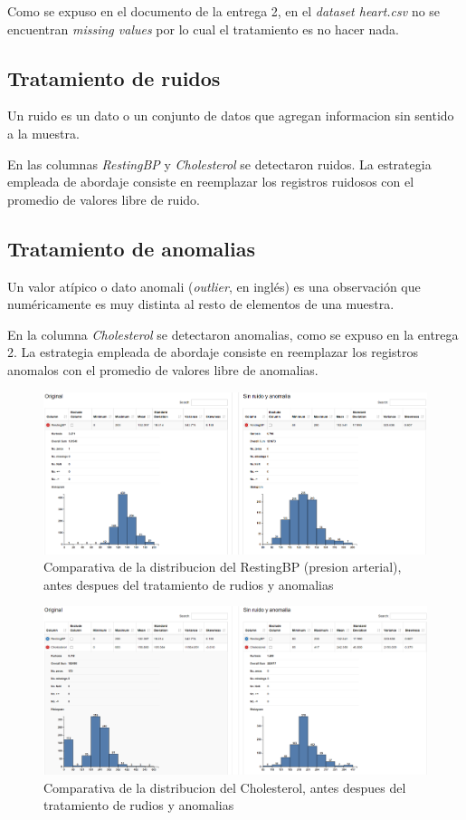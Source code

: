 \documentclass[12pt, letterpaper]{article}
\begin{document}
Como se expuso en el documento de la entrega 2, en el \textit{dataset heart.csv}
no se encuentran \textit{missing values} por lo cual el tratamiento es no hacer nada.

\subsection{Tratamiento de ruidos}
Un ruido es un dato o un conjunto de datos que agregan informacion sin sentido a la muestra.
\cite{ruido}

En las columnas \textit{RestingBP} y \textit{Cholesterol} se detectaron ruidos. 
La estrategia empleada de abordaje consiste en reemplazar los registros ruidosos
con el promedio de valores libre de ruido.

\subsection{Tratamiento de anomalias}
Un valor atípico o dato anomali (\textit{outlier}, en inglés) 
es una observación que numéricamente es muy distinta al resto de elementos de una muestra.
\cite{anomalia}

En la columna \textit{Cholesterol} se detectaron anomalias, como se expuso en la entrega 2. 
La estrategia empleada de abordaje consiste en reemplazar los registros anomalos
con el promedio de valores libre de anomalias.

\begin{figure}
    \centering
    \includegraphics[scale=0.29]{comparativa-RestingBP.png}
    \caption{Comparativa de la distribucion del RestingBP (presion arterial), antes 
    despues del tratamiento de rudios y anomalias}
    \label{fig:comparativa-RestingBP}
\end{figure}

\begin{figure}
    \centering
    \includegraphics[scale=0.29]{comparativa-Cholesterol.png}
    \caption{Comparativa de la distribucion del Cholesterol, antes 
    despues del tratamiento de rudios y anomalias}
    \label{fig:comparativa-Cholesterol}
\end{figure}
\end{document}
